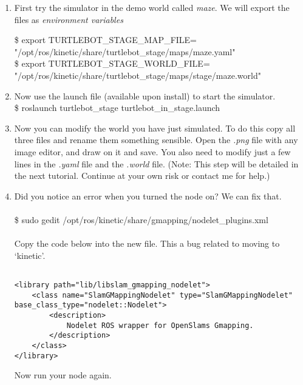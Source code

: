 \documentclass[12pt]{article}
\newcommand{\rosdistro}{kinetic}
\newcommand{\pthname}{/opt/ros/\rosdistro/share/turtlebot\_stage/maps/}
\begin{document}
\begin{enumerate}
\begin{itemize}
    \end{itemize}

    \item First try the simulator in the demo world called {\it maze}. We will export the files as {\it environment variables}

    {\selectfont  \hspace{5mm} \$ export TURTLEBOT\_STAGE\_MAP\_FILE=\\"\pthname maze.yaml"}\\
 
    {\selectfont  \hspace{5mm} \$ export TURTLEBOT\_STAGE\_WORLD\_FILE=\\"\pthname stage/maze.world"}\\
    
    \item Now use the launch file (available upon install) to start the simulator.\\
    {\selectfont  \hspace{5mm} \$ roslaunch turtlebot\_stage turtlebot\_in\_stage.launch}
    
    \item Now you can modify the world you have just simulated. To do this copy all three files and rename them something sensible. Open the {\it .png} file with any image editor, and draw on it and save. You also need to modify just a few lines in the {\it .yaml} file and the {\it .world} file. (Note: This step will be detailed in the next tutorial. Continue at your own risk or contact me for help.)
    
     \item Did you notice an error when you turned the node on? We can fix that.  \\\\
    
    	 {\selectfont  \hspace{5mm} \$ sudo  gedit /opt/ros/\rosdistro/share/gmapping/nodelet\_plugins.xml}\\\\
    	 
    	 Copy the code below into the new file. This a bug related to moving to `kinetic'.\\
    \lstset{language=XML}
     \begin{lstlisting}

<library path="lib/libslam_gmapping_nodelet">
    <class name="SlamGMappingNodelet" type="SlamGMappingNodelet" base_class_type="nodelet::Nodelet">
        <description>
            Nodelet ROS wrapper for OpenSlams Gmapping.
        </description>
    </class>
</library>
      \end{lstlisting}

\vspace{5mm}    Now run your node again.
\end{enumerate}
\end{document}
